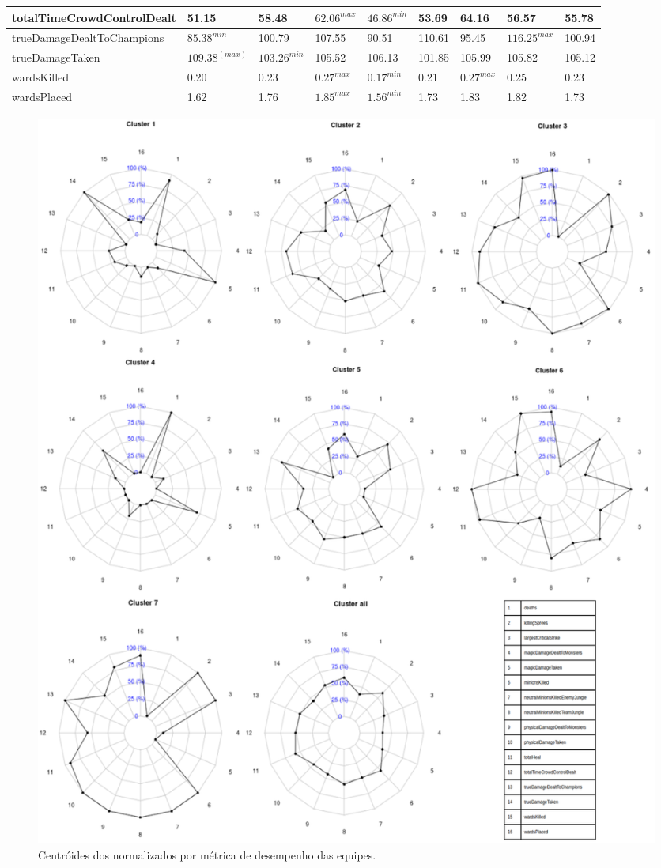 \begin{table}
\begin{tabular}{lp{}p{}p{}p{}p{}p{}p{}p{}}
totalTimeCrowdControlDealt&        51.15&   58.48&   $62.06^{max}$&   $46.86^{min}$&   53.69&   64.16&    56.57&   55.78\\ \hline
trueDamageDealtToChampions&        $85.38^{min}$&  100.79&  107.55&   90.51&  110.61&   95.45&   $116.25^{max}$&  100.94\\ \hline
trueDamageTaken&                  $109.38^{(max)}$&  $103.26^{min}$&  105.52&  106.13&  101.85&  105.99&   105.82&  105.12\\ \hline
wardsKilled&                        0.20&    0.23&    $0.27^{max}$&    $0.17^{min}$&    0.21&    $0.27^{max}$&     0.25&    0.23\\ \hline
wardsPlaced&                        1.62&    1.76&    $1.85^{max}$&    $1.56^{min}$&    1.73&    1.83&     1.82&    1.73\\
  \bottomrule
\end{tabular}
\end{table}

\begin{figure}
\includegraphics[width=1\textwidth,height=\textheight,keepaspectratio]{radars}
\caption{Centróides dos  normalizados por métrica de desempenho das equipes.}
\label{fig:radars}
\end{figure}

